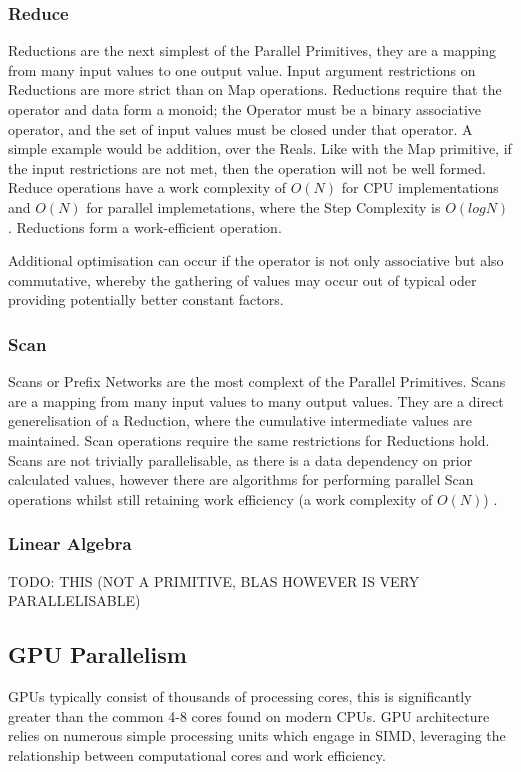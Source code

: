 \subsubsection{Reduce}

Reductions are the next simplest of the Parallel Primitives, they are a mapping from many input
values to one output value. Input argument restrictions on Reductions are more strict than on Map
operations. Reductions require that the operator and data form a monoid; the Operator must be a
binary associative operator, and the set of input values must be closed under that operator. A
simple example would be addition, over the Reals. Like with the Map primitive, if the input
restrictions are not met, then the operation will not be well formed. Reduce operations have a work
complexity of $ O(N) $ for CPU implementations and $ O(N) $ for parallel implemetations, where the
Step Complexity is $ O(log N) $. Reductions form a work-efficient operation.

Additional optimisation can occur if the operator is not only associative but also commutative,
whereby the gathering of values may occur out of typical oder providing potentially better constant
factors.


\subsubsection{Scan}

Scans or Prefix Networks are the most complext of the Parallel Primitives. Scans are a mapping from
many input values to many output values. They are a direct generelisation of a Reduction, where the
cumulative intermediate values are maintained. Scan operations require the same restrictions for
Reductions hold. Scans are not trivially parallelisable, as there is a data dependency on
prior calculated values, however there are algorithms for performing parallel Scan operations whilst
still retaining work efficiency (a work complexity of $ O(N) $) \cite{ScanOp}.

\subsubsection{Linear Algebra}
TODO: THIS (NOT A PRIMITIVE, BLAS HOWEVER IS VERY PARALLELISABLE)

\subsection{GPU Parallelism}
GPUs typically consist of thousands of processing cores, this is significantly greater than the
common 4-8 cores found on modern CPUs. GPU architecture relies on numerous simple processing units
which engage in SIMD, leveraging the relationship between computational cores and work efficiency.

